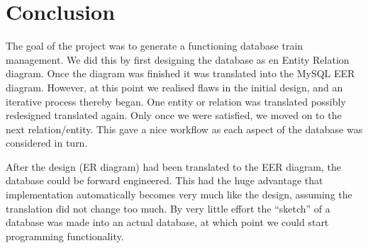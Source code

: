 \section{Conclusion}


The goal of the project was to generate a functioning database train 
management. We did this by first designing the database as en Entity Relation 
diagram. Once the diagram was finished it was translated into the MySQL EER 
diagram. However, at this point we realised flaws in the initial design, and an 
iterative process thereby began. One entity or relation was translated possibly 
redesigned translated again. Only once we were satisfied, we moved on to the 
next relation/entity. This gave a nice workflow as each aspect of the database 
was considered in turn.

After the design (ER diagram) had been translated to the EER diagram, the 
database could be forward engineered. This had the huge advantage that 
implementation automatically becomes very much like the design, assuming the 
translation did not change too much. By very little effort the ``sketch'' of a 
database was made into an actual database, at which point we could start 
programming functionality.



